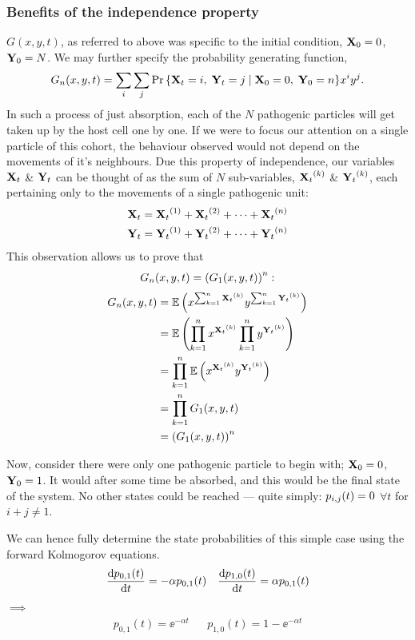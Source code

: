 \subsubsection*{Benefits of the independence property}
$G(x,y,t)$, as referred to above was specific to the initial condition, ${\bf X}_0 = 0$, ${\bf Y}_0 = N$. We may further specify the probability generating function,
\begin{equation*}
G_n(x,y,t) = \sum_i\sum_j {\text{Pr}\left\{{{\bf X}_t} = i,\;{{\bf Y}_t}=j \;|\;{\bf X}_0 = 0,\;{\bf Y}_0=n \right\}} x^i y^j.
\end{equation*}
In such a process of just absorption, each of the $N$ pathogenic particles will get taken up by the host cell one by one. If we were to focus our attention on a single particle of this cohort, the behaviour observed would not depend on the movements of it's neighbours. Due this property of independence, our variables ${{\bf X}_t}$ \& ${{\bf Y}_t}$ can be thought of as the sum of $N$ sub-variables, ${{\bf X}_t}^{(k)}$ \& ${{\bf Y}_t}^{(k)}$, each pertaining only to the movements of a single pathogenic unit: 
\begin{align*}
{{\bf X}_t} = {{\bf X}_t}^{(1)} + {{\bf X}_t}^{(2)} + \dots + {{\bf X}_t}^{(n)}\\
{{\bf Y}_t} = {{\bf Y}_t}^{(1)} + {{\bf Y}_t}^{(2)} + \dots + {{\bf Y}_t}^{(n)}
\end{align*}
This observation allows us to prove that 
\begin{equation}
\label{indRelPGF}
G_n(x,y,t) = \left( G_1(x,y,t)\right)^n:
\end{equation}
\begin{align*}
G_n(x,y,t) &= \mathbb{E}\left(x^{\sum_{k=1}^n {{\bf X}_t}^{(k)}} y^{\sum_{k=1}^n {{\bf Y}_t}^{(k)}}\right)\\
&=  \mathbb{E}\left(\prod_{k=1}^n x^{{{\bf X}_t}^{(k)}} \prod_{k=1}^n y^{{{\bf Y}_t}^{(k)}} \right)\\
&=  \prod_{k=1}^n\mathbb{E}\left( x^{{{\bf X}_t}^{(k)}} y^{{{\bf Y}_t}^{(k)}} \right)\\
&=  \prod_{k=1}^n G_1(x,y,t)\\
&= \left(G_1(x,y,t)\right)^n
\end{align*}

\noindent
Now, consider there were only one pathogenic particle to begin with; ${\bf X}_0 = 0$, ${\bf Y}_0 = 1$. It would after some time be absorbed, and this would be the final state of the system. No other states could be reached --- quite simply: $p_{i,j}(t) = 0$ $\forall t$ for $i+j \neq1$.\par
We can hence fully determine the state probabilities of this simple case using the forward Kolmogorov equations.
\begin{align*}
\displaystyle\frac{{\rm d} p_{0,1}(t)}{{\rm d} t} = -\alpha p_{0,1}(t) && \displaystyle\frac{{\rm d} p_{1,0}(t)}{{\rm d} t} = \alpha p_{0,1}(t) 
\end{align*}
$\implies$
\begin{align*}
p_{0,1}(t) = \ee^{-\alpha t} && p_{1,0}(t) = 1 - \ee^{-\alpha t}
\end{align*}





